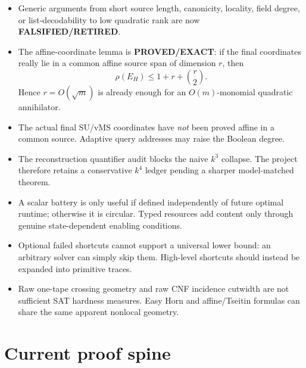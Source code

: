 \documentclass[11pt]{article}
\newcommand{\statusproved}{\textcolor{proved}{\textbf{PROVED/EXACT}}}
\newcommand{\statusretired}{\textcolor{retired}{\textbf{FALSIFIED/RETIRED}}}
\begin{document}
\begin{itemize}
  \item Generic arguments from short source length, canonicity, locality, field degree, or
  list-decodability to low quadratic rank are now \statusretired.
  \item The affine-coordinate lemma is \statusproved: if the final coordinates really lie in a
  common affine source span of dimension \(r\), then
  \[
     \rho(E_H)\le 1+r+\binom{r}{2}.
  \]
  Hence \(r=O(\sqrt m)\) is already enough for an \(O(m)\)-monomial quadratic annihilator.
  \item The actual final SU/vMS coordinates have \emph{not} been proved affine in a common source.
  Adaptive query addresses may raise the Boolean degree.
  \item The reconstruction quantifier audit blocks the naive \(k^3\) collapse. The project therefore
  retains a conservative \(k^4\) ledger pending a sharper model-matched theorem.
  \item A scalar battery is only useful if defined independently of future optimal runtime; otherwise
  it is circular. Typed resources add content only through genuine state-dependent enabling conditions.
  \item Optional failed shortcuts cannot support a universal lower bound: an arbitrary solver can
  simply skip them. High-level shortcuts should instead be expanded into primitive traces.
  \item Raw one-tape crossing geometry and raw CNF incidence cutwidth are not sufficient SAT hardness
  measures. Easy Horn and affine/Tseitin formulas can share the same apparent nonlocal geometry.
\end{itemize}

\section{Current proof spine}
\end{document}

